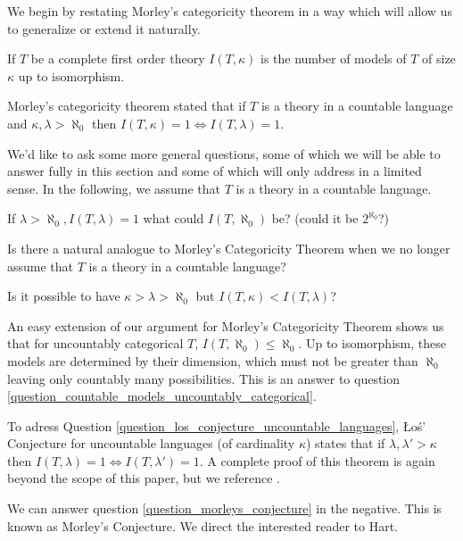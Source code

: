 We begin by restating Morley's categoricity theorem in a way which will allow us to generalize or extend it naturally.

\begin{definition}\label{definition_number_models}
If \(T\) be a complete first order theory \(I(T, \kappa)\) is the number of models of \(T\) of size \(\kappa\) up to isomorphism.
\end{definition}

Morley's categoricity theorem stated that if \(T\) is a theory in a countable language and \(\kappa, \lambda > \aleph_0\) then \(I(T, \kappa) = 1 \iff I(T, \lambda) = 1\). 

We'd like to ask some more general questions, some of which we will be able to answer fully in this section and some of which will only address in a limited sense. 
In the following, we assume that \(T\) is a theory in a countable language. 

\begin{question}\label{question_countable_models_uncountably_categorical}
If \(\lambda > \aleph_0, I(T, \lambda) = 1\) what could \(I(T, \aleph_0)\) be? (could it be \(2^{\aleph_0}\)?)
\end{question}

\begin{question}\label{question_los_conjecture_uncountable_languages}
Is there a natural analogue to Morley's Categoricity Theorem when we no longer assume that \(T\) is a theory in a countable language?
\end{question}

\begin{question}\label{question_morleys_conjecture}
Is it possible to have \(\kappa > \lambda > \aleph_0\) but \(I(T, \kappa) < I(T, \lambda)\)?
\end{question}

An easy extension of our argument for Morley's Categoricity Theorem shows us that for uncountably categorical \(T\), \(I(T, \aleph_0)\leq \aleph_0\).
Up to isomorphism, these models are determined by their dimension, which must not be greater than \(\aleph_0\) leaving only countably many possibilities. 
This is an answer to question \ref{question_countable_models_uncountably_categorical}.

To adress Question \ref{question_los_conjecture_uncountable_languages}, \L o\'s' Conjecture for uncountable languages (of cardinality \(\kappa\)) states that if \(\lambda, \lambda' >\kappa\) then \(I(T, \lambda) = 1 \iff I(T, \lambda') = 1\). 
A complete proof of this theorem is again beyond the scope of this paper, but we reference \cite{shelahUncountable}.

We can answer question \ref{question_morleys_conjecture} in the negative. This is known as Morley's Conjecture. 
We direct the interested reader to Hart\cite{hart}.
